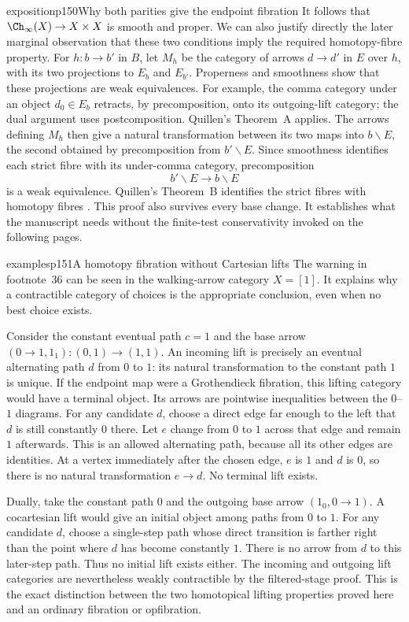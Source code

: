 \begin{dcomment}{exposition}{p150}{Why both parities give the endpoint fibration}
It follows that $\Ch_\infty(X)\to X\times X$ is smooth and proper. We can also justify directly the later marginal observation that these two conditions imply the required homotopy-fibre property. For $h:b\to b'$ in $B$, let $M_h$ be the category of arrows $d\to d'$ in $E$ over $h$, with its two projections to $E_b$ and $E_{b'}$. Properness and smoothness show that these projections are weak equivalences. For example, the comma category under an object $d_0\in E_b$ retracts, by precomposition, onto its outgoing-lift category; the dual argument uses postcomposition. Quillen's Theorem~A applies. The arrows defining $M_h$ then give a natural transformation between its two maps into $b\backslash E$, the second obtained by precomposition from $b'\backslash E$. Since smoothness identifies each strict fibre with its under-comma category, precomposition
\[
 b'\backslash E\longrightarrow b\backslash E
\]
is a weak equivalence. Quillen's Theorem~B identifies the strict fibres with homotopy fibres \citep[\S1, Theorem~B]{Quillen1973}. This proof also survives every base change. It establishes what the manuscript needs without the finite-test conservativity invoked on the following pages.
\end{dcomment}

\begin{dcomment}{examples}{p151}{A homotopy fibration without Cartesian lifts}
The warning in footnote~36 can be seen in the walking-arrow category $X=[1]$. It explains why a contractible category of choices is the appropriate conclusion, even when no best choice exists.

Consider the constant eventual path $c=1$ and the base arrow $(0\to1,1_1):(0,1)\to(1,1)$. An incoming lift is precisely an eventual alternating path $d$ from $0$ to $1$: its natural transformation to the constant path $1$ is unique. If the endpoint map were a Grothendieck fibration, this lifting category would have a terminal object. Its arrows are pointwise inequalities between the $0$--$1$ diagrams. For any candidate $d$, choose a direct edge far enough to the left that $d$ is still constantly $0$ there. Let $e$ change from $0$ to $1$ across that edge and remain $1$ afterwards. This is an allowed alternating path, because all its other edges are identities. At a vertex immediately after the chosen edge, $e$ is $1$ and $d$ is $0$, so there is no natural transformation $e\to d$. No terminal lift exists.

Dually, take the constant path $0$ and the outgoing base arrow $(1_0,0\to1)$. A cocartesian lift would give an initial object among paths from $0$ to $1$. For any candidate $d$, choose a single-step path whose direct transition is farther right than the point where $d$ has become constantly $1$. There is no arrow from $d$ to this later-step path. Thus no initial lift exists either. The incoming and outgoing lift categories are nevertheless weakly contractible by the filtered-stage proof. This is the exact distinction between the two homotopical lifting properties proved here and an ordinary fibration or opfibration.
\end{dcomment}


